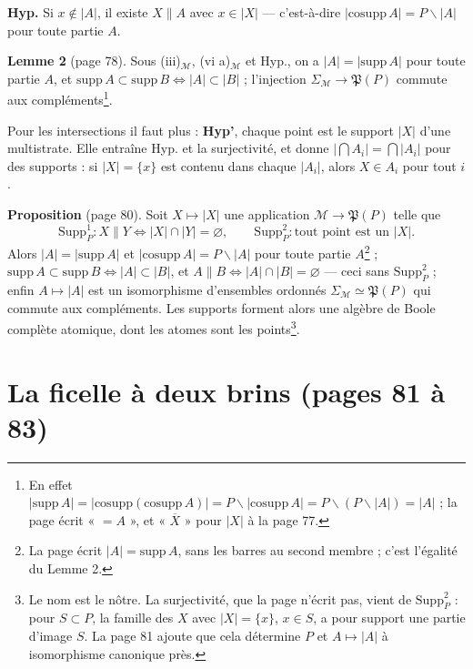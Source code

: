 \documentclass[11pt,a4paper]{article}
\begin{document}
\textbf{Hyp.} Si $x \notin |A|$, il existe $X \parallel A$ avec $x \in |X|$ ---
c'est-à-dire $|\mathrm{cosupp}\, A| = P \smallsetminus |A|$ pour toute partie $A$.

\textbf{Lemme 2} (page 78). Sous (iii)$_{\mathcal{M}}$, (vi a)$_{\mathcal{M}}$ et
Hyp., on a $|A| = |\mathrm{supp}\, A|$ pour toute partie $A$, et
$\mathrm{supp}\, A \subset \mathrm{supp}\, B \iff |A| \subset |B|$ ; l'injection
$\Sigma_{\mathcal{M}} \to \mathfrak{P}(P)$ commute aux compléments\footnote{En
effet $|\mathrm{supp}\, A| = |\mathrm{cosupp}(\mathrm{cosupp}\, A)| = P
\smallsetminus |\mathrm{cosupp}\, A| = P \smallsetminus (P \smallsetminus |A|) =
|A|$ ; la page écrit « $= A$ », et « $\overline{X}$ » pour $|X|$ à la page 77.}.

Pour les intersections il faut plus : \textbf{Hyp'}, chaque point est le support
$|X|$ d'une multistrate. Elle entraîne Hyp. et la surjectivité, et donne
$|\bigcap A_{i}| = \bigcap |A_{i}|$ pour des supports : si $|X| = \{x\}$ est contenu
dans chaque $|A_{i}|$, alors $X \in A_{i}$ pour tout $i$.

\textbf{Proposition} (page 80). Soit $X \mapsto |X|$ une application $\mathcal{M}
\to \mathfrak{P}(P)$ telle que
\[
\mathrm{Supp}^{1}_{P} : X \parallel Y \iff |X| \cap |Y| = \varnothing, \qquad
\mathrm{Supp}^{2}_{P} : \text{tout point est un } |X| .
\]
Alors $|A| = |\mathrm{supp}\, A|$ et $|\mathrm{cosupp}\, A| = P \smallsetminus |A|$
pour toute partie $A$\footnote{La page écrit $|A| = \mathrm{supp}\, A$, sans les
barres au second membre ; c'est l'égalité du Lemme 2.} ; $\mathrm{supp}\, A
\subset \mathrm{supp}\, B \iff |A| \subset |B|$, et $A \parallel B \iff |A| \cap
|B| = \varnothing$ --- ceci sans $\mathrm{Supp}^{2}_{P}$ ; enfin $A \mapsto |A|$ est
un isomorphisme d'ensembles ordonnés $\Sigma_{\mathcal{M}} \simeq \mathfrak{P}(P)$
qui commute aux compléments. Les supports forment alors une algèbre de Boole
complète atomique, dont les atomes sont les points\footnote{Le nom est le nôtre.
La surjectivité, que la page n'écrit pas, vient de $\mathrm{Supp}^{2}_{P}$ : pour
$S \subset P$, la famille des $X$ avec $|X| = \{x\}$, $x \in S$, a pour support une
partie d'image $S$. La page 81 ajoute que cela détermine $P$ et $A \mapsto |A|$ à
isomorphisme canonique près.}.

\section*{La ficelle à deux brins (pages 81 à 83)}
\end{document}
